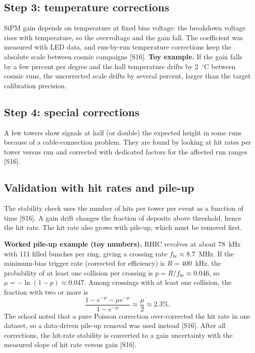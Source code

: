 \documentclass[11pt,letterpaper]{article}
\begin{document}
\subsection{Step 3: temperature corrections}
SiPM gain depends on temperature at fixed bias voltage: the breakdown voltage rises with temperature, so the overvoltage and the gain fall.
The coefficient was measured with LED data, and run-by-run temperature corrections keep the absolute scale between cosmic campaigns [S16].
\textbf{Toy example.} If the gain falls by a few percent per degree and the hall temperature drifts by 2~$^\circ$C between cosmic runs,
the uncorrected scale drifts by several percent, larger than the target calibration precision.

\subsection{Step 4: special corrections}
A few towers show signals at half (or double) the expected height in some runs because of a cable-connection problem.
They are found by looking at hit rates per tower versus run and corrected with dedicated factors for the affected run ranges [S16].

\subsection{Validation with hit rates and pile-up}
The stability check uses the number of hits per tower per event as a function of time [S16]. A gain drift changes the fraction of deposits above threshold, hence the hit rate.
The hit rate also grows with pile-up, which must be removed first.

\textbf{Worked pile-up example (toy numbers).} RHIC revolves at about 78~kHz with 111 filled bunches per ring, giving a crossing rate $f_{bc}\approx8.7$~MHz.
If the minimum-bias trigger rate (corrected for efficiency) is $R=400$~kHz, the probability of at least one collision per crossing is $p=R/f_{bc}\approx0.046$,
so $\mu=-\ln(1-p)\approx0.047$. Among crossings with at least one collision, the fraction with two or more is
\begin{equation}
\frac{1-e^{-\mu}-\mu e^{-\mu}}{1-e^{-\mu}} \approx \frac{\mu}{2} \approx 2.3\%.
\end{equation}
The school noted that a pure Poisson correction over-corrected the hit rate in one dataset, so a data-driven pile-up removal was used instead [S16].
After all corrections, the hit-rate stability is converted to a gain uncertainty with the measured slope of hit rate versus gain [S16].
\end{document}
